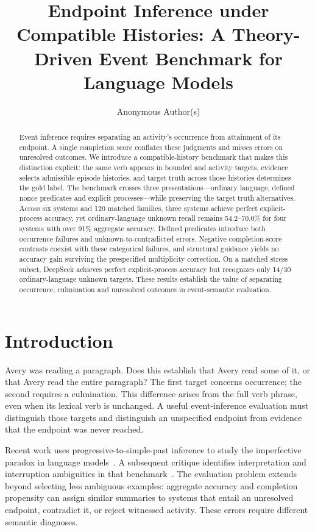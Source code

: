 \documentclass[sigconf,anonymous,review]{acmart}
\title[Endpoint Inference under Compatible Histories]{Endpoint Inference under Compatible Histories: A Theory-Driven Event Benchmark for Language Models}
\author{Anonymous Author(s)}
\begin{document}
\begin{abstract}
Event inference requires separating an activity's occurrence from attainment of its endpoint. A single completion score conflates these judgments and misses errors on unresolved outcomes. We introduce a compatible-history benchmark that makes this distinction explicit: the same verb appears in bounded and activity targets, evidence selects admissible episode histories, and target truth across those histories determines the gold label. The benchmark crosses three presentations---ordinary language, defined nonce predicates and explicit processes---while preserving the target truth alternatives. Across six systems and 120 matched families, three systems achieve perfect explicit-process accuracy, yet ordinary-language unknown recall remains 54.2--70.0\% for four systems with over 91\% aggregate accuracy. Defined predicates introduce both occurrence failures and unknown-to-contradicted errors. Negative completion-score contrasts coexist with these categorical failures, and structural guidance yields no accuracy gain surviving the prespecified multiplicity correction. On a matched stress subset, DeepSeek achieves perfect explicit-process accuracy but recognizes only 14/30 ordinary-language unknown targets. These results establish the value of separating occurrence, culmination and unresolved outcomes in event-semantic evaluation.

\end{abstract}
\maketitle
\section{Introduction}
Avery was reading a paragraph. Does this establish that Avery read some of it, or that Avery read the entire paragraph? The first target concerns occurrence; the second requires a culmination. This difference arises from the full verb phrase, even when its lexical verb is unchanged. A useful event-inference evaluation must distinguish those targets and distinguish an unspecified endpoint from evidence that the endpoint was never reached.

Recent work uses progressive-to-simple-past inference to study the imperfective paradox in language models~\cite{ma2026}. A subsequent critique identifies interpretation and interruption ambiguities in that benchmark~\cite{han2026}. The evaluation problem extends beyond selecting less ambiguous examples: aggregate accuracy and completion propensity can assign similar summaries to systems that entail an unresolved endpoint, contradict it, or reject witnessed activity. These errors require different semantic diagnoses.
\end{document}

